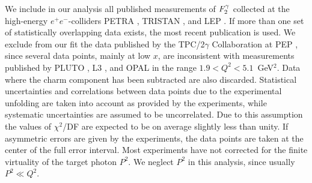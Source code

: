 \documentclass[aps,prl,twocolumn,groupedaddress]{revtex4}
\begin{document}
We include in our analysis all published measurements of $\f2y$ collected at
the high-energy $e^+e^-$-colliders PETRA \cite{Bartel:1984cg,Berger:1984xt,
Althoff:1986fi}, TRISTAN \cite{Sahu:1995gj,Kojima:1997wg,
Muramatsu:1994rq}, and LEP \cite{Barate:1999qy,Abreu:1996xt,Acciarri:1998ig,
Ackerstaff:1997ni,Ackerstaff:1997se,
Abbiendi:2000cw,Abbiendi:2002te}. If more than one set of statistically
overlapping data exists, the most recent publication is used. We exclude from
our fit the data published by the TPC/2$\gamma$ Collaboration at PEP
\cite{Aihara:1987xq,Aihara:1987xw}, since several data points, mainly at low
$x$, are inconsistent with measurements
published by PLUTO \cite{Berger:1984xt}, L3 \cite{Acciarri:1998ig}, and OPAL
\cite{Abbiendi:2000cw} in the range $1.9 < Q^2 < 5.1$~GeV$^2$. Data where the
charm component has been subtracted are also discarded. Statistical
uncertainties and correlations between data points due to the experimental
unfolding are taken into account as provided by the experiments, while
systematic uncertainties are assumed to be uncorrelated. Due to this assumption
the values of $\chi^2$/DF are expected to be on average slightly less than
unity. If asymmetric errors
are given by the experiments, the data points are taken at the center of the
full error interval. Most experiments have not corrected for the finite
virtuality of the target photon $P^2$. We neglect $P^2$ in this analysis,
since usually $P^2\ll Q^2$.
\end{document}
